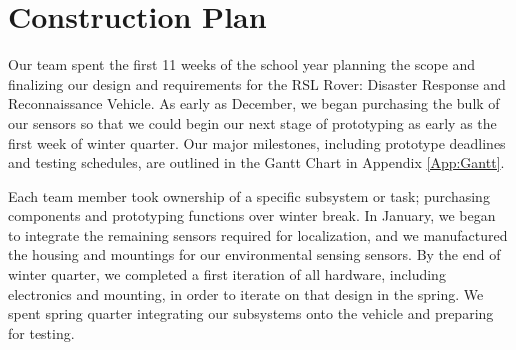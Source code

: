 \chapter{Construction Plan}

Our team spent the first 11 weeks of the school year planning the scope and finalizing our design and requirements for the RSL Rover: Disaster Response and Reconnaissance Vehicle. As early as December, we began purchasing the bulk of our sensors so that we could begin our next stage of prototyping as early as the first week of winter quarter. Our major milestones, including prototype deadlines and testing schedules, are outlined in the Gantt Chart in Appendix \ref{App:Gantt}. 

Each team member took ownership of a specific subsystem or task; purchasing components and prototyping functions over winter break. In January, we began to integrate the remaining sensors required for localization, and we manufactured the housing and mountings for our environmental sensing sensors. By the end of winter quarter, we completed a first iteration of all hardware, including electronics and mounting, in order to iterate on that design in the spring. We spent spring quarter integrating our subsystems onto the vehicle and preparing for testing. 
